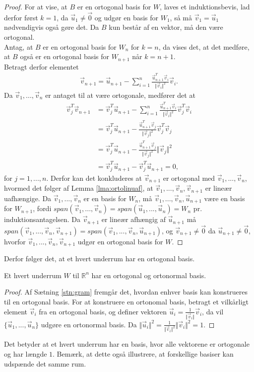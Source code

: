 \begin{proof}
For at  vise, at $B$ er en ortogonal basis for $W$, laves et induktionsbevis, lad derfor først $k= 1$, da $\vec{u}_1\neq \vec{0}$ og udgør en basis for $W_1$, så må $\vec{v}_1 = \vec{u}_1$ nødvendigvis også gøre det.
Da $B$ kun består af en vektor, må den være ortogonal.
\\Antag, at $B$ er en ortogonal basis for $W_n$ for $k=n$, da vises det, at det medføre, at $B$ også er en ortogonal basis for  $W_{n+1}$ når $k = n+1$.
\\Betragt derfor elementet 
\begin{align*}
\vec{v}_{n+1} = \vec{u}_{n+1} - \sum_{i=1}^n \frac{\vec{u}_{n+1}^T\vec{v}_i}{\Vert\vec{v}_i\Vert^2}\vec{v}_i.
\end{align*}
Da $\vec{v}_1,...,\vec{v}_n$ er antaget til at være ortogonale, medfører det at
\begin{align*}
\vec{v}_j^T\vec{v}_{n+1} &= \vec{v}_j^T\vec{u}_{n+1} - \sum_{i=1}^n \frac{\vec{u}_{n+1}^T\vec{v}_i}{\Vert\vec{v}_i\Vert^2}\vec{v}_j^T\vec{v}_i
\\ &= \vec{v}_j^T\vec{u}_{n+1} - \frac{\vec{u}_{n+1}^T\vec{v}_j}{\Vert\vec{v}_j\Vert^2}\vec{v}_j^T\vec{v}_j
\\ & = \vec{v}_j^T\vec{u}_{n+1} -  \frac{\vec{u}_{n+1}^T\vec{v}_j}{\Vert\vec{v}_j\Vert^2}\Vert\vec{v}_j\Vert^2
\\ & =\vec{v}_j^T\vec{u}_{n+1} - \vec{v}_j^T\vec{u}_{n+1} = 0 , 
\end{align*}
for $j = 1,...,n$. 
Derfor kan det konkluderes at $\vec{v}_{n+1}$ er ortogonal med $\vec{v}_1,...,\vec{v}_n$, hvormed det følger af Lemma \ref{lma:ortolinuaf}, at $\vec{v}_1,...,\vec{v}_n, \vec{v}_{n+1}$ er lineær uafhængige.
Da $\vec{v}_1,...,\vec{v}_n$ er en basis for $W_n$, må $\vec{v}_1,...,\vec{v}_n, \vec{u}_{n+1}$ være en basis for $W_{n+1}$, fordi $span(\vec{v}_1,...,\vec{v}_n) = span(\vec{u}_1,...,\vec{u}_n) = W_n$ pr. induktionsantagelsen. 
Da $\vec{v}_{n+1}$ er lineær afhængig af $\vec{u}_{n+1}$ må $span(\vec{v}_1,...,\vec{v}_n, \vec{v}_{n+1}) = span(\vec{v}_1,...,\vec{v}_n, \vec{u}_{n+1})$, og $\vec{v}_{n+1} \neq \vec{0}$ da $\vec{u}_{n+1} \neq \vec{0}$, hvorfor $\vec{v}_1,...,\vec{v}_n, \vec{v}_{n+1}$ udgør en ortogonal basis for $W$.
\end{proof}
Derfor følger det, at et hvert underrum har en ortogonal basis.
\begin{kor}
Et hvert underrum $W$ til $\mathds{R}^n$ har en ortogonal og ortonormal basis.
\end{kor}
\begin{proof}
Af Sætning \ref{stn:gram} fremgår det, hvordan enhver basis kan konstrueres til en ortogonal basis. 
For at konstruere en ortonomal basis, betragt et vilkårligt element $\vec{v}_i$ fra en ortogonal basis, og definer vektoren $\vec{u}_i = \frac{1}{\Vert\vec{v}_i\Vert}\vec{v}_i$, da vil $\{\vec{u}_1,...,\vec{u}_n\}$ udgøre en ortonormal basis. 
Da $\Vert\vec{u}_i\Vert^2 = \frac{1}{\Vert\vec{v}_i\Vert^2}\Vert\vec{v}_i\Vert^2 = 1$.
\end{proof}
Det betyder at et hvert underrum har en basis, hvor alle vektorene er ortogonale og har længde $1$.
Bemærk, at dette også illustrere, at forskellige basiser kan udspænde det samme rum. 



 